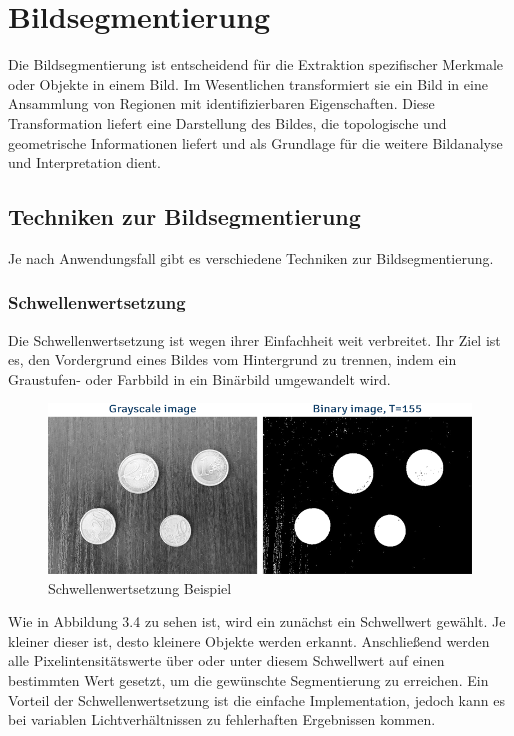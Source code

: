 \section{Bildsegmentierung}
Die Bildsegmentierung ist entscheidend für die Extraktion spezifischer Merkmale oder Objekte in einem Bild. Im Wesentlichen transformiert sie ein
Bild in eine Ansammlung von Regionen mit identifizierbaren Eigenschaften. Diese Transformation liefert eine Darstellung des Bildes, die topologische
und geometrische Informationen liefert und als Grundlage für die weitere Bildanalyse und Interpretation dient.

\subsection{Techniken zur Bildsegmentierung}
Je nach Anwendungsfall gibt es verschiedene Techniken zur Bildsegmentierung.

\subsubsection{Schwellenwertsetzung}
Die Schwellenwertsetzung ist wegen ihrer Einfachheit weit verbreitet. Ihr Ziel ist es, den Vordergrund eines Bildes vom Hintergrund zu trennen, 
indem ein Graustufen- oder Farbbild in ein Binärbild umgewandelt wird.

\begin{figure}[h]
    \centering
    \includegraphics[scale=0.5]{images/threshholding.png}
    \caption{Schwellenwertsetzung Beispiel}
\end{figure}

Wie in Abbildung 3.4 zu sehen ist, wird ein zunächst ein Schwellwert gewählt. Je kleiner dieser ist, desto kleinere Objekte werden erkannt.
Anschließend werden alle Pixelintensitätswerte über oder unter diesem Schwellwert auf einen bestimmten Wert gesetzt, um die gewünschte Segmentierung
zu erreichen. Ein Vorteil der Schwellenwertsetzung ist die einfache Implementation, jedoch kann es bei variablen Lichtverhältnissen zu fehlerhaften
Ergebnissen kommen. 

